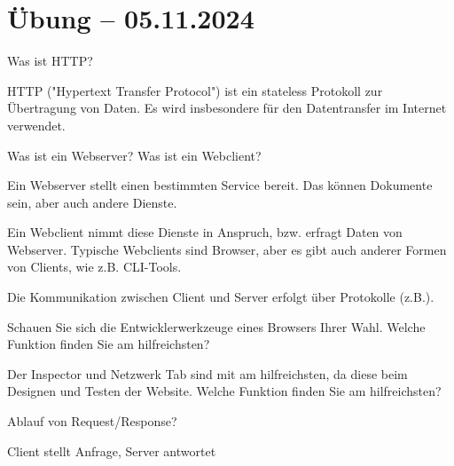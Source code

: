 \documentclass[11pt]{article}
\begin{document}
\section{Übung -- 05.11.2024}
\begin{aufgabe}
  Was ist HTTP?

  HTTP ("Hypertext Transfer Protocol") ist ein stateless Protokoll zur Übertragung von Daten. Es wird insbesondere
  für den Datentransfer im Internet verwendet.
\end{aufgabe}
\begin{aufgabe}
  Was ist ein Webserver? Was ist ein Webclient?

  Ein Webserver stellt einen bestimmten Service bereit. Das können Dokumente sein, aber auch andere Dienste.

  Ein Webclient nimmt diese Dienste in Anspruch, bzw. erfragt Daten von Webserver. Typische Webclients sind Browser, aber
  es gibt auch anderer Formen von Clients, wie z.B. CLI-Tools.

  Die Kommunikation zwischen Client und Server erfolgt über Protokolle (z.B.).
\end{aufgabe}
\begin{aufgabe}
  Schauen Sie sich die Entwicklerwerkzeuge eines Browsers Ihrer Wahl. Welche Funktion finden Sie am hilfreichsten?

  Der Inspector und Netzwerk Tab sind mit am hilfreichsten, da diese beim Designen und Testen der Website. Welche Funktion finden Sie am hilfreichsten?
\end{aufgabe}
\begin{aufgabe}
  Ablauf von Request/Response?

  Client stellt Anfrage, Server antwortet
\end{aufgabe}
\end{document}
